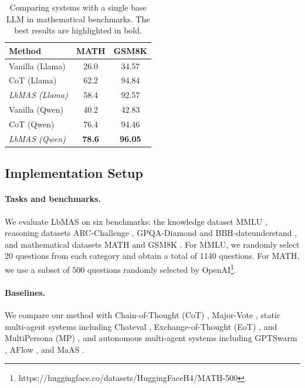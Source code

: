 \documentclass[11pt]{article}
\begin{document}
\begin{table}[]
\caption{Comparing systems with a single base LLM in mathematical benchmarks. The best results are highlighted in bold.}
\centering
\begin{tabular}{@{}lcc@{}}
\toprule
\textbf{Method} & \textbf{MATH} & \textbf{GSM8K} \\ \midrule
Vanilla (Llama)  & 26.0            & 34.57          \\
CoT (Llama)      & 62.2          & 94.84          \\
\textit{LbMAS (Llama)}    & 58.4          & 92.57          \\ \midrule
Vanilla (Qwen)   & 40.2          & 42.83          \\
CoT (Qwen)       & 76.4          & 94.46          \\
\textit{LbMAS (Qwen)}     & \textbf{78.6} & \textbf{96.05} \\ \bottomrule
\end{tabular}
\label{tab:single}
\end{table}

\subsection{Implementation Setup}

\paragraph{Tasks and benchmarks.}
We evaluate LbMAS on six benchmarks: the knowledge dataset MMLU \citep{hendrycks2021measuring}, reasoning datasets ARC-Challenge \citep{clark2018thinksolvedquestionanswering}, GPQA-Diamond \citep{rein2024gpqa} and BBH-dateunderstand \citep{suzgun-etal-2023-challengingbbh}, and mathematical datasets MATH \citep{hendrycks2021measuringmath} and GSM8K \citep{cobbe2021trainingverifierssolvemath}. For MMLU, we randomly select 20 questions from each category and obtain a total of 1140 questions. For MATH, we use a subset of 500 questions randomly selected by OpenAI\footnote{https://huggingface.co/datasets/HuggingFaceH4/MATH-500}. 
\paragraph{Baselines.}
We compare our method with Chain-of-Thought (CoT) \citep{wei2022chain}, Major-Vote \citep{li2024more},  static multi-agent systems including Chateval \citep{chan2308chateval}, Exchange-of-Thought (EoT) \citep{yin2023exchangeofthought}, and MultiPersona (MP) \citep{liang-etal-2024-encouraging}, and autonomous multi-agent systems including GPTSwarm \citep{zhuge2024gptswarm}, AFlow \citep{zhang2025aflow}, and MaAS \citep{zhang2025multi}. 
\end{document}
